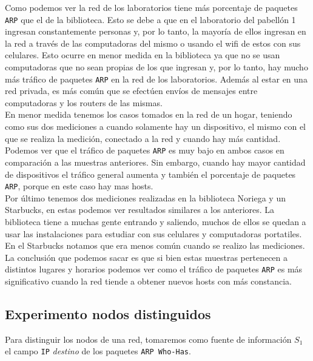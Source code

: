 Como podemos ver la red de los laboratorios tiene más porcentaje de paquetes \texttt{ARP} que el de la biblioteca. Esto se debe a que en el laboratorio del pabellón 1 ingresan
constantemente personas y, por lo tanto, la mayoría de ellos ingresan en la red a través de las computadoras del mismo o usando el wifi de estos con sus celulares. Esto
ocurre en menor medida en la biblioteca ya que no se usan computadoras que no sean propias de los que ingresan y, por lo tanto, hay mucho más tráfico de paquetes \texttt{ARP} en la red
de los laboratorios. Además al estar en una red privada, es más común que se efectúen envíos de mensajes entre computadoras y los routers de las mismas.\\

En menor medida tenemos los casos tomados en la red de un hogar, teniendo como sus dos mediciones a cuando solamente hay un dispositivo, el mismo con el que se realiza la medición,
conectado a la red y cuando hay más cantidad. Podemos ver que el tráfico de paquetes \texttt{ARP} es muy bajo en ambos casos en comparación a las muestras anteriores. Sin embargo,
cuando hay mayor cantidad de dispositivos el tráfico general aumenta y también el porcentaje de paquetes \texttt{ARP}, porque en este caso hay mas hosts.\\

Por último tenemos dos mediciones realizadas en la biblioteca Noriega y un Starbucks, en estas podemos ver resultados similares a los anteriores. La biblioteca tiene a muchas
gente entrando y saliendo, muchos de ellos se quedan a usar las instalaciones para estudiar con sus celulares y computadoras portatiles. En el Starbucks notamos que era menos
común cuando se realizo las mediciones.\\

La conclusión que podemos sacar es que si bien estas muestras pertenecen a distintos lugares y horarios podemos ver como el tráfico de paquetes \texttt{ARP} es más significativo cuando
la red tiende a obtener nuevos hosts con más constancia.



\subsection{Experimento nodos distinguidos}

Para distinguir los nodos de una red, tomaremos como fuente de información $S_1$ el campo
\texttt{IP} \textit{destino} de los paquetes \texttt{ARP Who-Has}.

